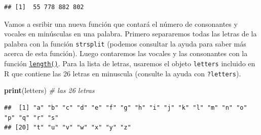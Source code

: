 \documentclass[
]{book}
\newenvironment{Shaded}{\begin{snugshade}}{\end{snugshade}}
\newcommand{\CommentTok}[1]{\textcolor[rgb]{0.56,0.35,0.01}{\textit{#1}}}
\newcommand{\ControlFlowTok}[1]{\textcolor[rgb]{0.13,0.29,0.53}{\textbf{#1}}}
\newcommand{\DataTypeTok}[1]{\textcolor[rgb]{0.13,0.29,0.53}{#1}}
\newcommand{\DecValTok}[1]{\textcolor[rgb]{0.00,0.00,0.81}{#1}}
\newcommand{\KeywordTok}[1]{\textcolor[rgb]{0.13,0.29,0.53}{\textbf{#1}}}
\newcommand{\NormalTok}[1]{#1}
\newcommand{\OperatorTok}[1]{\textcolor[rgb]{0.81,0.36,0.00}{\textbf{#1}}}
\newcommand{\StringTok}[1]{\textcolor[rgb]{0.31,0.60,0.02}{#1}}
\begin{document}
\begin{verbatim}
## [1]  55 778 882 802
\end{verbatim}

Vamos a esribir una nueva función que contará el número de consonantes y vocales en minúsculas en una palabra. Primero separaremos todas las letras de la palabra con la función \texttt{strsplit} (podemos consultar la ayuda para saber más acerca de esta función). Luego contaremos las vocales y las consonantes con la función \protect\hyperlink{l015length}{\texttt{length()}}. Para la lista de letras, usaremos el objeto \texttt{letters} incluido en R que contiene las 26 letras en minuscula (consulte la ayuda con \texttt{?letters}).

\begin{Shaded}
\begin{Highlighting}[]
\KeywordTok{print}\NormalTok{(letters) }\CommentTok{# las 26 letras}
\end{Highlighting}
\end{Shaded}

\begin{verbatim}
##  [1] "a" "b" "c" "d" "e" "f" "g" "h" "i" "j" "k" "l" "m" "n" "o" "p" "q" "r" "s"
## [20] "t" "u" "v" "w" "x" "y" "z"
\end{verbatim}

\begin{Shaded}
\end{Shaded}
\end{document}
